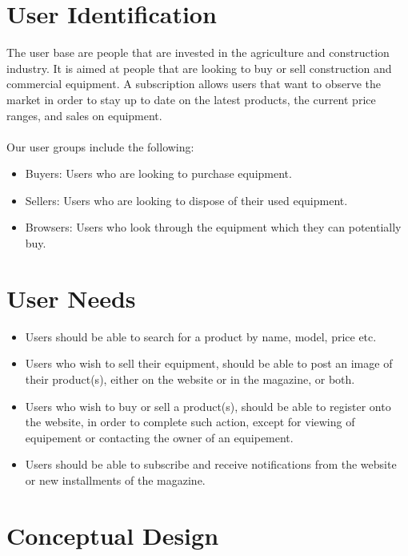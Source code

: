 \documentclass[12pt]{article}
\begin{document}
\section{User Identification}

The user base are people that are invested in the agriculture and construction industry. It is aimed at people that are looking to buy or sell construction and commercial equipment. A subscription allows users that want to observe the market in order to stay up to date on the latest products, the current price ranges, and sales on equipment.
\\ \\
Our user groups include the following:

\begin{itemize}
	\item Buyers: Users who are looking to purchase equipment.
	\item Sellers: Users who are looking to dispose of their used equipment.
	\item Browsers: Users who look through the equipment which they can potentially buy.
\end{itemize}

\section{User Needs}

\begin{itemize}
	\item Users should be able to search for a product by name, model, price etc.
	\item Users who wish to sell their equipment, should be able to post an image of their product(s), either on the website or in the magazine, or both.
	\item Users who wish to buy or sell a product(s), should be able to register onto the website, in order to complete such action, except for viewing of equipement or contacting the owner of an equipement.
	\item Users should be able to subscribe and receive notifications from the website or new installments of the magazine.
\end{itemize}

\section{Conceptual Design}
\end{document}
